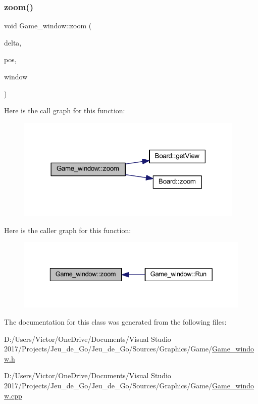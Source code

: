 \subsubsection{\texorpdfstring{zoom()}{zoom()}}
{\footnotesize\ttfamily void Game\+\_\+window\+::zoom (\begin{DoxyParamCaption}\item[{const float}]{delta,  }\item[{sf\+::\+Vector2i}]{pos,  }\item[{sf\+::\+Render\+Window \&}]{window }\end{DoxyParamCaption})}

Here is the call graph for this function\+:\nopagebreak
\begin{figure}[H]
\begin{center}
\leavevmode
\includegraphics[width=309pt]{class_game__window_a9b9b15469cb0ced1a22f28e447983b56_cgraph}
\end{center}
\end{figure}
Here is the caller graph for this function\+:\nopagebreak
\begin{figure}[H]
\begin{center}
\leavevmode
\includegraphics[width=329pt]{class_game__window_a9b9b15469cb0ced1a22f28e447983b56_icgraph}
\end{center}
\end{figure}


The documentation for this class was generated from the following files\+:\begin{DoxyCompactItemize}
\item 
D\+:/\+Users/\+Victor/\+One\+Drive/\+Documents/\+Visual Studio 2017/\+Projects/\+Jeu\+\_\+de\+\_\+\+Go/\+Jeu\+\_\+de\+\_\+\+Go/\+Sources/\+Graphics/\+Game/\hyperlink{_game__window_8h}{Game\+\_\+window.\+h}\item 
D\+:/\+Users/\+Victor/\+One\+Drive/\+Documents/\+Visual Studio 2017/\+Projects/\+Jeu\+\_\+de\+\_\+\+Go/\+Jeu\+\_\+de\+\_\+\+Go/\+Sources/\+Graphics/\+Game/\hyperlink{_game__window_8cpp}{Game\+\_\+window.\+cpp}\end{DoxyCompactItemize}
